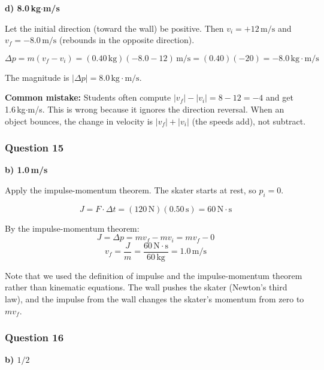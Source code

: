 \documentclass[12pt,letterpaper]{article}
\begin{document}
\begin{answerbox}
\textbf{d) 8.0\,kg$\cdot$m/s}
\end{answerbox}

\begin{explanationbox}
Let the initial direction (toward the wall) be positive. Then $v_i = +12\,\text{m/s}$ and $v_f = -8.0\,\text{m/s}$ (rebounds in the opposite direction).

\[
\Delta p = m(v_f - v_i) = (0.40\,\text{kg})(-8.0 - 12)\,\text{m/s} = (0.40)(-20) = -8.0\,\text{kg}\cdot\text{m/s}
\]

The magnitude is $|\Delta p| = 8.0\,\text{kg}\cdot\text{m/s}$.

\textbf{Common mistake:} Students often compute $|v_f| - |v_i| = 8 - 12 = -4$ and get 1.6\,kg$\cdot$m/s. This is wrong because it ignores the direction reversal. When an object bounces, the change in velocity is $|v_f| + |v_i|$ (the speeds add), not subtract.
\end{explanationbox}

\subsubsection*{Question 15}

\begin{answerbox}
\textbf{b) 1.0\,m/s}
\end{answerbox}

\begin{explanationbox}
Apply the impulse-momentum theorem. The skater starts at rest, so $p_i = 0$.

\[
J = F \cdot \Delta t = (120\,\text{N})(0.50\,\text{s}) = 60\,\text{N}\cdot\text{s}
\]

By the impulse-momentum theorem:
\[
J = \Delta p = mv_f - mv_i = mv_f - 0
\]
\[
v_f = \frac{J}{m} = \frac{60\,\text{N}\cdot\text{s}}{60\,\text{kg}} = 1.0\,\text{m/s}
\]

Note that we used the definition of impulse and the impulse-momentum theorem rather than kinematic equations. The wall pushes the skater (Newton's third law), and the impulse from the wall changes the skater's momentum from zero to $mv_f$.
\end{explanationbox}

\subsubsection*{Question 16}

\begin{answerbox}
\textbf{b) $1/2$}
\end{answerbox}
\end{document}
